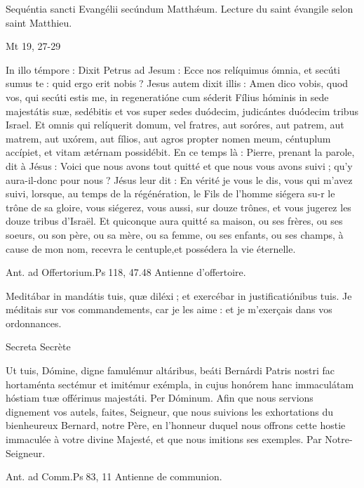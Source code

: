 \begin{paracol}{2}
Sequéntia sancti Evangélii secúndum Matthǽum.
\switchcolumn
Lecture du saint évangile selon saint Matthieu.
\switchcolumn*

Mt 19, 27-29
\switchcolumn

\switchcolumn*

In illo témpore : Dixit Petrus ad  Jesum : Ecce nos relíquimus ómnia, et secúti sumus te : quid ergo erit nobis ? Jesus autem dixit illis : Amen dico vobis, quod vos, qui secúti estis me, in regeneratióne cum séderit Fílius hóminis in sede majestátis suæ, sedébitis et vos super sedes duódecim, judicántes duódecim tribus Israel. Et omnis qui relíquerit domum, vel fratres, aut soróres, aut patrem, aut matrem, aut uxórem, aut fílios, aut agros propter nomen meum, céntuplum accípiet, et vitam ætérnam possidébit.
\switchcolumn
En ce temps là : Pierre, prenant la parole,  dit à Jésus : Voici que nous avons tout quitté et que nous vous avons suivi ; qu’y aura-il-donc pour nous ? Jésus leur dit : En vérité je vous le dis, vous qui m’avez suivi, lorsque, au temps de la régénération, le Fils de l’homme siégera su-r le trône de sa gloire, vous siégerez, vous aussi, sur douze trônes, et vous jugerez les douze tribus d’Israël.  Et quiconque aura quitté sa maison, ou ses frères, ou ses soeurs, ou son père, ou sa mère, ou sa femme, ou ses enfants, ou ses champs, à cause de mon nom, recevra le centuple,et possédera la vie éternelle.
\switchcolumn*

Ant. ad Offertorium.\hfill Ps 118, 47.48
\switchcolumn
Antienne d’offertoire.
\switchcolumn*

Meditábar in mandátis tuis, quæ diléxi ; et exercébar in justificatiónibus tuis.
\switchcolumn
Je méditais sur vos commandements, car je les aime : et je m’exerçais dans vos ordonnances.
\switchcolumn*

Secreta
\switchcolumn
Secrète
\switchcolumn*

Ut tuis, Dómine, digne famulémur  altáribus, beáti Bernárdi Patris nostri fac hortaménta sectémur et imitémur exémpla, in cujus honórem hanc immaculátam hóstiam tuæ offérimus majestáti. Per Dóminum.
\switchcolumn
Afin que nous servions dignement  vos autels, faites, Seigneur, que nous suivions les exhortations du bienheureux Bernard, notre Père, en l’honneur duquel nous offrons cette hostie immaculée à votre divine Majesté,  et que nous imitions ses exemples. Par Notre-Seigneur.
\switchcolumn*

Ant. ad Comm.\hfill Ps 83, 11
\switchcolumn
Antienne de communion.
\switchcolumn*


\end{paracol}
